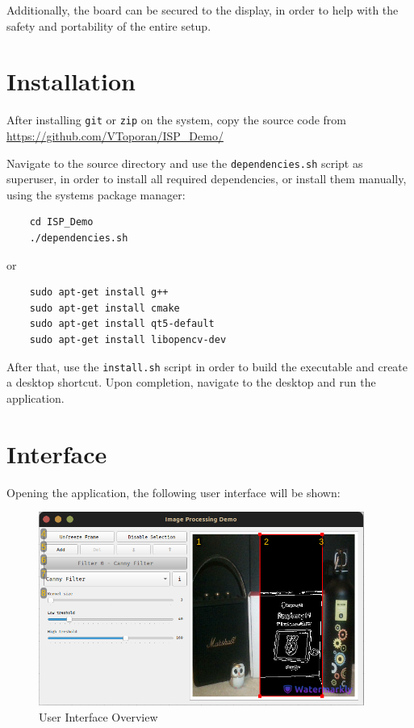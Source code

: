Additionally, the board can be secured to the display, in order to help with the safety and portability of the
entire setup.

\section{Installation}

After installing \verb|git| or \verb|zip| on the system, copy the source code from
\url{https://github.com/VToporan/ISP_Demo/}

Navigate to the source directory and use the \verb|dependencies.sh| script as superuser, in order to install
all required dependencies, or install them manually, using the systems package manager:
\begin{code}
	\begin{lstlisting}
    cd ISP_Demo
    ./dependencies.sh
    \end{lstlisting}
\end{code}
or
\begin{code}
	\begin{lstlisting}
    sudo apt-get install g++
    sudo apt-get install cmake
    sudo apt-get install qt5-default
    sudo apt-get install libopencv-dev
    \end{lstlisting}
\end{code}

After that, use the \verb|install.sh| script in order to build the executable and create a desktop shortcut.
Upon completion, navigate to the desktop and run the application.

\pagebreak
\section{Interface}

Opening the application, the following user interface will be shown:
\begin{figure}[H]
	\includegraphics[width=0.95\textwidth, height=0.5\textwidth]{resources/Manual_Outline.jpg}
	\caption{User Interface Overview}
\end{figure}


